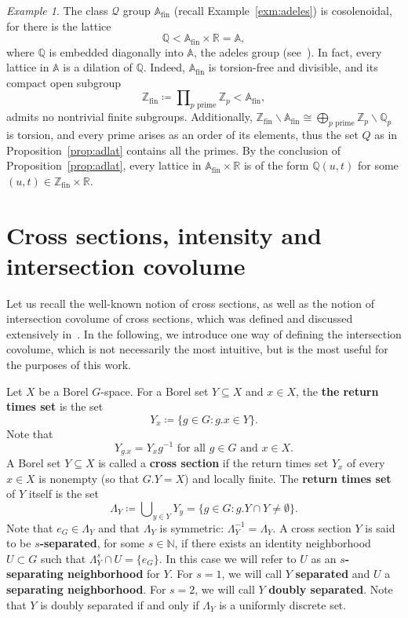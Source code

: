 \documentclass{amsart}
\numberwithin{equation}{subsection}
\theoremstyle{remark}
\newtheorem{exm}[thm]{Example}
\begin{document}
\begin{exm}\label{exm:adeles2}
The class \(\mathcal{Q}\) group \(\mathbb{A}_{\mathrm{fin}}\) (recall Example~\ref{exm:adeles}) is cosolenoidal, for there is the lattice
\[\mathbb{Q}<\mathbb{A}_{\mathrm{fin}}\times\mathbb{R}=\mathbb{A},\]
where \(\mathbb{Q}\) is embedded diagonally into \(\mathbb{A}\), the adeles group (see~\cite[Ch.~VII, §2]{lang1994algebraic}). In fact, every lattice in \(\mathbb{A}\) is a dilation of \(\mathbb{Q}\). Indeed, \(\mathbb{A}_{\mathrm{fin}}\) is torsion-free and divisible, and its compact open subgroup
\[\mathbb{Z}_{\mathrm{fin}}\coloneqq\prod\nolimits_{p\text{ prime}}\mathbb{Z}_{p}<\mathbb{A}_{\mathrm{fin}},\]
admits no nontrivial finite subgroups. Additionally, \(\mathbb{Z}_{\mathrm{fin}}\backslash\mathbb{A}_{\mathrm{fin}}\cong\bigoplus_{p\text{ prime}}\mathbb{Z}_{p}\backslash\mathbb{Q}_{p}\) is torsion, and every prime arises as an order of its elements, thus the set \(Q\) as in Proposition~\ref{prop:adlat} contains all the primes. By the conclusion of Proposition~\ref{prop:adlat}, every lattice in \(\mathbb{A}_{\mathrm{fin}}\times\mathbb{R}\) is of the form \(\mathbb{Q}\left(u,t\right)\) for some \(\left(u,t\right)\in \mathbb{Z}_{\mathrm{fin}}\times\mathbb{R}\).
\end{exm}

\section{Cross sections, intensity and intersection covolume}\label{sct:intcovol}

Let us recall the well-known notion of cross sections, as well as the notion of intersection covolume of cross sections, which was defined and discussed extensively in~\cite{AvBjCuI}. In the following, we introduce one way of defining the intersection covolume, which is not necessarily the most intuitive, but is the most useful for the purposes of this work.

Let \(X\) be a Borel \(G\)-space. For a Borel set \(Y\subseteq X\) and \(x\in X\), the {\bf the return times set} is the set
\[Y_{x}\coloneqq\{g\in G:g.x\in Y\}.\]
Note that
\[Y_{g.x}=Y_{x}g^{-1}\text{ for all }g\in G\text{ and }x\in X.\]
A Borel set \(Y\subseteq X\) is called a {\bf cross section} if the return times set \(Y_{x}\) of every \(x\in X\) is nonempty (so that \(G.Y=X\)) and locally finite. 
The {\bf return times set} of \(Y\) itself is the set
\[\Lambda_{Y}\coloneqq \bigcup\nolimits_{y\in Y}Y_{y}=\{g\in G:g.Y\cap Y\neq\emptyset\}.\]
Note that \(e_{G}\in\Lambda_{Y}\) and that \(\Lambda_{Y}\) is symmetric: \(\Lambda_{Y}^{-1}=\Lambda_{Y}\). A cross section \(Y\) is said to be {\bf \(s\)-separated}, for some \(s\in\mathbb{N}\), if there exists an identity neighborhood \(U\subset G\) such that \(\Lambda_{Y}^{s}\cap U=\{e_{G}\}\). In this case we will refer to \(U\) as an \(s\){\bf-separating neighborhood} for \(Y\). For \(s=1\), we will call \(Y\) {\bf separated} and \(U\) a {\bf separating neighborhood}. For \(s=2\), we will call \(Y\) {\bf doubly separated}. Note that \(Y\) is doubly separated if and only if \(\Lambda_{Y}\) is a uniformly discrete set.
\end{document}
